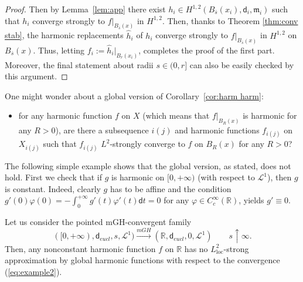 \documentclass[a4paper,11pt,reqno]{article}
\numberwithin{equation}{section}
\theoremstyle{plain}
\theoremstyle{definition}
\theoremstyle{remark}
\let\altphi\phi
\let\phi\varphi
\let\varphi\altphi
\let\altphi\undefined
\newcommand{\dist}{\mathsf{d}}
\newcommand{\meas}{\mathfrak{m}}
\begin{document}
{\begin{proof}
Then by Lemma~\ref{lem:app} there exist $h_i \in H^{1, 2}(B_{\bar s}(x_i), \dist_i, \meas_i)$ such that $h_i$ converge strongly to 
$f\vert_{B_{\bar s}(x)}$ in $H^{1, 2}$. Then, thanks to Theorem \ref{thm:conv stab}, the harmonic replacements $\hat{h}_i$ of $h_i$
converge strongly to $f\vert_{B_{\bar s}(x)}$ in $H^{1, 2}$ on $B_{\bar s}(x)$.
Thus, letting $f_i:=\hat{h}_i\vert_{B_r(x_i)}$, completes the proof of the first part.
Moreover, the final statement about radii $s\in (0,r]$ can also be easily checked by this argument.
\end{proof}

\begin{remark}
One might wonder about a global version of Corollary~\ref{cor:harm harm}:
\begin{itemize}
\item[] for any harmonic function $f$ on $X$ (which means that $f\vert_{B_R(x)}$ is harmonic for any $R>0$), are there a subsequence $i(j)$ 
and harmonic functions $f_{i(j)}$ on $X_{i(j)}$ such that $f_{i(j)}$ $L^2$-strongly converge to $f$ on $B_R(x)$ for any $R>0$?
\end{itemize}
The following simple example shows that the global version, as stated, does not hold.
First we check that if $g$ is harmonic on $[0,+\infty)$ (with respect to $\mathcal{L}^1$), then $g$ is constant. Indeed,
clearly $g$ has to be affine and the condition $g'(0)\phi(0)=-\int_0^{+\infty}g'(t)\phi '(t)\dist t=0$
for any $\phi \in C^{\infty}_c(\mathbb{R})$, yields $g'\equiv 0$.

Let us consider the pointed mGH-convergent family
\begin{equation}\label{eq:example2}
([0, +\infty),\dist_{eucl}, s, \mathcal{L}^1) \stackrel{mGH}{\to} (\mathbb{R}, \dist_{eucl},0, \mathcal{L}^1)\qquad
s\uparrow\infty.
\end{equation}
Then, any nonconstant harmonic function $f$ on $\mathbb{R}$ has no $L^2_{\mathrm{loc}}$-strong approximation by global harmonic functions with respect to the convergence (\ref{eq:example2}).
\end{remark}

}
\end{document}
